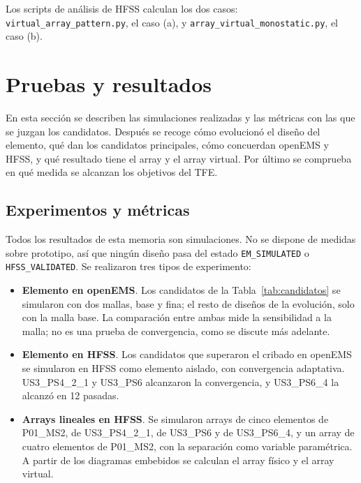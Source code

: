 \documentclass[11pt,a4paper]{article}
\begin{document}
Los scripts de análisis de HFSS calculan los dos casos:
\texttt{virtual\_array\_pattern.py}, el caso (a), y \texttt{array\_virtual\_monostatic.py}, el caso (b).

\section{Pruebas y resultados}\label{sec:resultados}
En esta sección se describen las simulaciones realizadas y las métricas con las que se juzgan los
candidatos. Después se recoge cómo evolucionó el diseño del elemento, qué dan los candidatos
principales, cómo concuerdan openEMS y HFSS, y qué resultado tiene el array y el array virtual.
Por último se comprueba en qué medida se alcanzan los objetivos del TFE.

\subsection{Experimentos y métricas}\label{sec:experimentos}
Todos los resultados de esta memoria son simulaciones. No se dispone de medidas sobre prototipo,
así que ningún diseño pasa del estado \texttt{EM\_SIMULATED} o \texttt{HFSS\_VALIDATED}. Se
realizaron tres tipos de experimento:
\begin{itemize}
    \item \textbf{Elemento en openEMS}. Los candidatos de la Tabla~\ref{tab:candidatos} se simularon con dos mallas, base y fina; el resto de diseños de la evolución, solo con la malla base. La comparación entre ambas mide la sensibilidad a la malla; no es una prueba de
    convergencia, como se discute más adelante.
    \item \textbf{Elemento en HFSS}. Los candidatos que superaron el cribado en openEMS se simularon
    en HFSS como elemento aislado, con convergencia adaptativa. US3\_PS4\_2\_1 y US3\_PS6 alcanzaron la convergencia, y US3\_PS6\_4 la alcanzó en 12 pasadas.
    \item \textbf{Arrays lineales en HFSS}. Se simularon arrays de cinco elementos de P01\_MS2, de US3\_PS4\_2\_1, de US3\_PS6 y de US3\_PS6\_4, y un array de cuatro elementos de P01\_MS2, con la separación como variable paramétrica. A partir de los diagramas embebidos se calculan el array físico y el array virtual.
\end{itemize}
\end{document}
